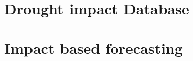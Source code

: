 \documentclass[11pt, a4paper, oneside]{book}
\begin{document}
\section{Drought impact Database}





\section{Impact based forecasting}









\end{document}
